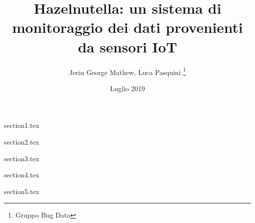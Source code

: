 \documentclass[titlepage]{article}
\title{\textbf{Hazelnutella: un sistema di monitoraggio dei dati provenienti da sensori IoT}}
\author{Jerin George Mathew, Luca Pasquini \thanks{Gruppo Bug Data}}
\date{Luglio 2019}
\begin{document}
\maketitle

\tableofcontents
\clearpage

{section1.tex}
\clearpage

{section2.tex}
\clearpage

{section3.tex}
\clearpage

{section4.tex}
\clearpage

{section5.tex}
\clearpage
\end{document}
